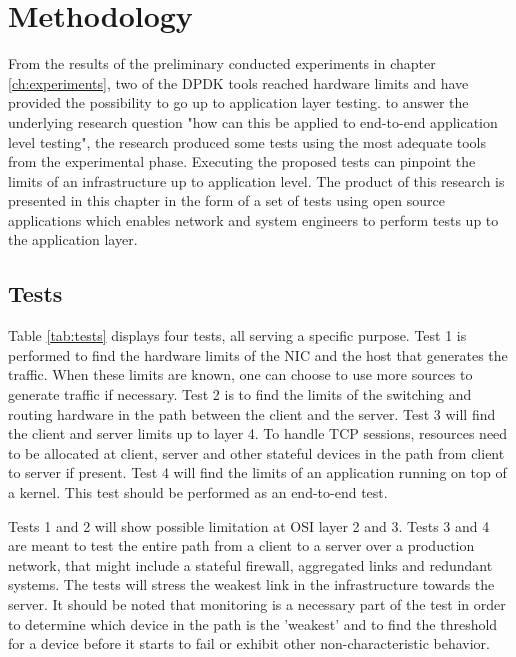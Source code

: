 \chapter{Methodology}\label{ch:method}
From the results of the preliminary conducted experiments in chapter \ref{ch:experiments}, two of the DPDK tools reached hardware limits and have provided the possibility to go up to application layer testing.  
to answer the underlying research question "how can this be applied to end-to-end application level testing", the research produced some tests using the most adequate tools from the experimental phase.
Executing the proposed tests can pinpoint the limits of an infrastructure up to application level.
The product of this research is presented in this chapter in the form of a set of tests using open source applications which enables network and system engineers to perform tests up to the application layer.

\section{Tests}\label{sec:tests}

Table \ref{tab:tests} displays four tests, all serving a specific purpose.
Test 1 is performed to find the hardware limits of the NIC and the host that generates the traffic. 
When these limits are known, one can choose to use more sources to generate traffic if necessary.  
Test 2 is to find the limits of the  switching and routing hardware in the path between the client and the server.
Test 3 will find the client and server limits up to layer 4. To handle TCP sessions, resources need to be allocated at client, server and other stateful devices in the path from client to server if present. 
Test 4 will find the limits of an application running on top of a kernel. This test should be performed as an end-to-end test.  

Tests 1 and 2 will show possible limitation at OSI layer 2 and 3. 
Tests 3 and 4 are meant to test the entire path from a client to a server over a production network, that might include a stateful firewall, aggregated links and redundant systems. 
The tests will stress the weakest link in the infrastructure towards the server.  
It should be noted that monitoring is a necessary part of the test in order to determine which device in the path is the 'weakest' and to find the threshold for a device before it starts to fail or exhibit other non-characteristic behavior. 

